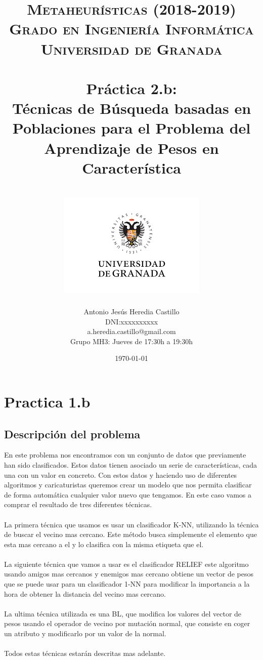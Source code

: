\documentclass[12pt,a4paper]{article}
\title{
\normalfont \normalsize 
\textsc{{\bf Metaheurísticas (2018-2019)} \\ Grado en Ingeniería Informática \\ Universidad de Granada} \\ [20pt] %
\horrule{0.5pt} \\[0.4cm] %
{\huge Práctica 2.b:}\\
Técnicas de Búsqueda basadas en Poblaciones
para el Problema del Aprendizaje de Pesos en
Característica \\ %
\horrule{2pt} \\[0.5cm] %
\includegraphics{images/logo.png}	
}
\author{Antonio Jesús Heredia Castillo\\DNI:xxxxxxxxxx\\a.heredia.castillo@gmail.com\\Grupo MH3: Jueves de 17:30h a 19:30h} %
\date{\normalsize\today} %
\begin{document}
\maketitle %
\newpage %
\tableofcontents %
\listoftables
\newpage
\section{Practica 1.b}
\subsection{Descripción del problema}
En este problema nos encontramos con un conjunto de datos que previamente han sido clasificados. Estos datos tienen asociado un serie de características, cada una con un valor en concreto. Con estos datos y haciendo uso de diferentes algoritmos y caricaturistas queremos crear un modelo que nos permita clasificar de forma automática cualquier valor nuevo que tengamos. En este caso vamos a comprar el resultado de tres diferentes técnicas.\\\\
La primera técnica que usamos es usar un clasificador K-NN,  utilizando la técnica de buscar el vecino mas cercano. Este método busca simplemente el elemento que esta mas cercano a el y lo clasifica con la misma etiqueta que el.\\\\
La siguiente técnica que vamos a usar es el clasificador RELIEF este algoritmo usando  amigos mas cercanos y enemigos mas cercano obtiene un vector de pesos que se puede usar para un clasificador 1-NN para modificar la importancia a la hora de obtener la distancia del vecino mas cercano.\\\\
La ultima técnica utilizada es una BL, que modifica los valores del vector de pesos usando el operador de vecino por mutación normal, que consiste en coger un atributo y modificarlo por un valor de la normal.\\\\

Todos estas técnicas estarán descritas mas adelante.
\end{document}
